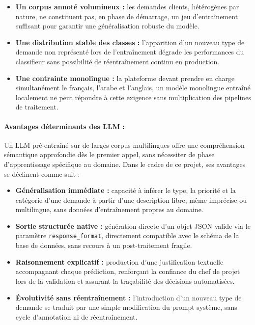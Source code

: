 \begin{itemize}[nosep,leftmargin=1.6cm,topsep=2pt,itemsep=3pt,
label=$\bullet$]
    \item \textbf{Un corpus annoté volumineux :} les demandes clients,
    hétérogènes par nature, ne constituent pas, en phase de démarrage,
    un jeu d'entraînement suffisant pour garantir une généralisation
    robuste du modèle.
    \item \textbf{Une distribution stable des classes :} l'apparition
    d'un nouveau type de demande non représenté lors de l'entraînement
    dégrade les performances du classifieur sans possibilité de
    réentraînement continu en production.
    \item \textbf{Une contrainte monolingue :} la plateforme devant
    prendre en charge simultanément le français, l'arabe et l'anglais,
    un modèle monolingue entraîné localement ne peut répondre à cette
    exigence sans multiplication des pipelines de traitement.
\end{itemize}

\paragraph{Avantages déterminants des LLM :}

Un LLM pré-entraîné sur de larges corpus multilingues offre une
compréhension sémantique approfondie dès le premier appel, sans
nécessiter de phase d'apprentissage spécifique au domaine. Dans le
cadre de ce projet, ses avantages se déclinent comme suit :

\begin{itemize}[nosep,leftmargin=1.6cm,topsep=2pt,itemsep=3pt,
label=$\bullet$]
    \item \textbf{Généralisation immédiate :} capacité à inférer le
    type, la priorité et la catégorie d'une demande à partir d'une
    description libre, même imprécise ou multilingue, sans données
    d'entraînement propres au domaine.
    \item \textbf{Sortie structurée native :} génération directe d'un
    objet JSON valide via le paramètre \texttt{response\_format},
    directement compatible avec le schéma de la base de données, sans
    recours à un post-traitement fragile.
    \item \textbf{Raisonnement explicatif :} production d'une
    justification textuelle accompagnant chaque prédiction, renforçant
    la confiance du chef de projet lors de la validation et assurant
    la traçabilité des décisions automatisées.
    \item \textbf{Évolutivité sans réentraînement :} l'introduction
    d'un nouveau type de demande se traduit par une simple modification
    du prompt système, sans cycle d'annotation ni de réentraînement.
\end{itemize}

